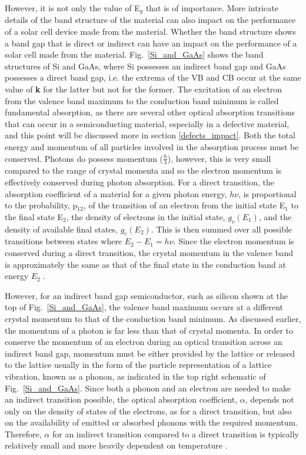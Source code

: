\documentclass[11pt, twoside]{report}
\begin{document}
However, it is not only the value of E$_g$ that is of importance. More intricate details of the band structure of the material can also impact on the performance of a solar cell device made from the material. Whether the band structure shows a band gap that is direct or indirect can have an impact on the performance of a solar cell made from the material. Fig.~\ref{Si_and_GaAs} shows the band structures of Si and GaAs, where Si possesses an indirect band gap and GaAs possesses a direct band gap, i.e. the extrema of the VB and CB occur at the same value of \textbf{k} for the latter but not for the former. The excitation of an electron from the valence band maximum to the conduction band minimum is called fundamental absorption, as there are several other optical absorption transitions that can occur in a semiconducting material, especially in a defective material, and this point will be discussed more in section \ref{defects_impact}. Both the total energy and momentum of all particles involved in the absorption process must be conserved. Photons do possess momentum ($\frac{h}{\lambda}$), however, this is very small compared to the range of crystal momenta and so the electron momentum is effectively conserved during photon absorption. For a direct transition, the absorption coefficient of a material for a given photon energy, $h \nu$, is proportional to the probability, p$_{12}$, of the transition of an electron from the initial state E$_1$ to the final state E$_2$, the density of electrons in the initial state, $g_{v}(E_1)$, and the density of available final states, $g_{c}(E_2)$. This is then summed over all possible transitions between states where $E_2 - E_1 = h\nu$. Since the electron momentum is conserved during a direct transition, the crystal momentum in the valence band is approximately the same as that of the final state in the conduction band at energy $E_2$ \cite{PV_bands_book}.

However, for an indirect band gap semiconductor, such as silicon shown at the top of Fig.~\ref{Si_and_GaAs}, the valence band maximum occurs at a different crystal momentum to that of the conduction band minimum. As discussed earlier, the momentum of a photon is far less than that of crystal momenta. In order to conserve the momentum of an electron during an optical transition across an indirect band gap, momentum must be either provided by the lattice or released to the lattice usually in the form of the particle representation of a lattice vibration, known as a phonon, as indicated in the top right schematic of Fig.~\ref{Si_and_GaAs}. Since both a phonon and an electron are needed to make an indirect transition possible, the optical absorption coefficient, $\alpha$, depends not only on the density of states of the electrons, as for a direct transition, but also on the availability of emitted or absorbed phonons with the required momentum. Therefore, $\alpha$ for an indirect transition compared to a direct transition is typically relatively small and more heavily dependent on temperature \cite{Nelson3}. 
\end{document}
